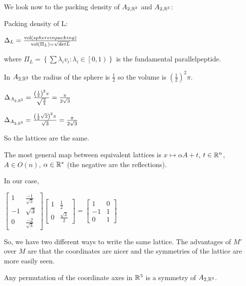 We look now to the packing density of $A_{2,\mathbb{R}^{2}}$ and $A_{2,\mathbb{R}^{3}}$:

Packing density of L: 

$\Delta_L=\frac{\operatorname{vol}(sphere in packing)}{\operatorname{vol}(\Pi_L)=\sqrt{detL}}$

where $\Pi_L=\left\{\sum\lambda_i v_i : \lambda_i\in\left[0,1\right)\right\}$ is the fundamental parallelpeptide.


In $A_{2,\mathbb{R}^{2}}$ the radius of the sphere is $\frac{1}{2}$ so the volume is $\left(\frac{1}{2}\right)^{2}\pi$.

$\Delta_{A_{2,\mathbb{R}^{2}}}=\frac{\left(\frac{1}{2}\right)^{2}\pi}{\sqrt{\frac{3}{4}}}=\frac{\pi}{2\sqrt{3}}$

$\Delta_{A_{2,\mathbb{R}^{3}}}=\frac{\left(\frac{1}{2}\sqrt{2}\right)^{2}\pi}{\sqrt{3}}=\frac{\pi}{2\sqrt{3}}$

So the lattices are the same.

The most general map between equivalent lattices is $x\longmapsto\alpha A+t$, $t\in\mathbb{R}^{n}$, $A\in O(n)$, $\alpha\in\mathbb{R}^{*}$ (the negative are the reflections).

In our case,

$\left[\begin{smallmatrix}
1 & \frac{-1}{\sqrt{3}} \\
-1 & \sqrt{3} \\
0 & \frac{-2}{\sqrt{3}}\end{smallmatrix}\right]\left[\begin{smallmatrix}
1 & \frac{1}{2} \\
0 & \frac{\sqrt{3}}{2}\end{smallmatrix}\right]=\left[\begin{smallmatrix}
1 & 0 \\
-1 & 1 \\
0 & 1\end{smallmatrix}\right]$

So, we have two different ways to write the same lattice. The advantages of $M'$ over $M$ are that the coordinates are nicer and the symmetries of the lattice are more easily seen.


\begin{claim}
Any permutation of the coordinate axes in $\mathbb{R}^{3}$ is a symmetry of $A_{2,\mathbb{R}^{3}}$.
\end{claim}


